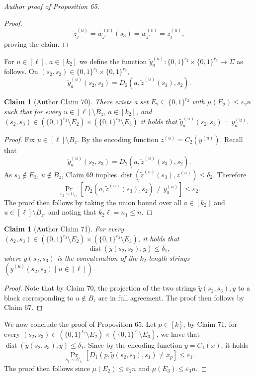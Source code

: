 \documentclass[10pt,a4paper]{article}
\newtheorem{ntclaim}[nttheorem]{Claim}
\begin{document}
\begin{proof}[Author proof of Proposition 65]
\begin{proof}
\[\widetilde z_j^{(u)}=\widetilde w_{j'}^{(v)}(s_3)=w_{j'}^{(v)}=z_j^{(u)},\]
proving the claim.
\end{proof}
For $u\in[\ell]$, $a\in[k_2]$ we define the function $\widetilde y_a^{(u)}:\{0,1\}^{r_2}\times\{0,1\}^{r_3}\to\Sigma$ as follows. On $(s_2,s_3)\in\{0,1\}^{r_2}\times\{0,1\}^{r_3}$,
\[\widetilde y_a^{(u)}(s_2,s_3)=D_2(a,\widetilde z^{(u)}(s_3),s_2).\]
\begin{ntclaim}[Author Claim 70]
There exists a set $E_2\subseteq\{0,1\}^{r_2}$ with $\mu(E_2)\leq\varepsilon_2n$ such that for every $u\in[\ell]\setminus B_z$, $a\in[k_2]$, and $(s_2,s_3)\in(\{0,1\}^{r_2}\setminus E_2)\times(\{0,1\}^{r_3}\setminus E_3)$ it holds that $\widetilde y_a^{(u)}(s_2,s_3)=y_a^{(u)}$.
\end{ntclaim}
\begin{proof}
Fix $u\in[\ell]\setminus B_z$. By the encoding function $z^{(u)}=C_2(y^{(u)})$. Recall that
\[\widetilde y_a^{(u)}(s_2,s_3)=D_2(a,\widetilde z^{(u)}(s_3),s_2).\]
As $s_3\notin E_3$, $u\notin B_z$, Claim 69 implies $\operatorname{dist}(\widetilde z^{(u)}(s_3),z^{(u)})\leq\delta_2$. Therefore
\[\Pr_{s_2\sim U_{r_2}}[D_2(a,\widetilde z^{(u)}(s_3),s_2)\ne y_a^{(u)}]\leq\varepsilon_2.\]
The proof then follows by taking the union bound over all $a\in[k_2]$ and $u\in[\ell]\setminus B_z$, and noting that $k_2\ell=n_1\leq n$.
\end{proof}
\begin{ntclaim}[Author Claim 71]
For every $(s_2,s_3)\in(\{0,1\}^{r_2}\setminus E_2)\times(\{0,1\}^{r_3}\setminus E_3)$, it holds that
\[\operatorname{dist}(\widetilde y(s_2,s_3),y)\leq\delta_1,\]
where $\widetilde y(s_2,s_3)$ is the concatenation of the $k_2$-length strings $(\widetilde y^{(u)}(s_2,s_3)\mid u\in[\ell])$.
\end{ntclaim}
\begin{proof}
Note that by Claim 70, the projection of the two strings $\widetilde y(s_2,s_3),y$ to a block corresponding to $u\notin B_z$ are in full agreement. The proof then follows by Claim 67.
\end{proof}
We now conclude the proof of Proposition 65. Let $p\in[k]$, by Claim 71, for every $(s_2,s_3)\in(\{0,1\}^{r_2}\setminus E_2)\times(\{0,1\}^{r_3}\setminus E_3)$, we have that $\operatorname{dist}(\widetilde y(s_2,s_3),y)\leq\delta_1$. Since by the encoding function $y=C_1(x)$, it holds
\[\Pr_{s_1\sim U_{r_1}}[D_1(p,\widetilde y(s_2,s_3),s_1)\ne x_p]\leq\varepsilon_1.\]
The proof then follows since $\mu(E_2)\leq\varepsilon_2n$ and $\mu(E_3)\leq\varepsilon_3n$.
\end{proof}
\end{document}
